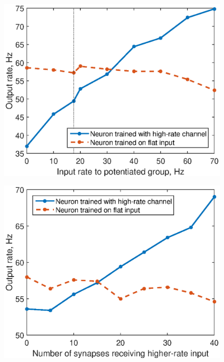 \documentclass[a4paper,12pt]{report}
\theoremstyle{definition}
\begin{document}
\begin{figure}
\centering
\begin{minipage}{.5\textwidth}
  \centering
  \includegraphics[width=1\linewidth]{figures/exp1_filter.eps}
  \label{fig:test1}
\end{minipage}%
\begin{minipage}{.5\textwidth}
  \centering
  \includegraphics[width=1\linewidth]{figures/exp5_patterncompletion.eps}
  \label{fig:test2}
\end{minipage}
\end{figure}
\end{document}
